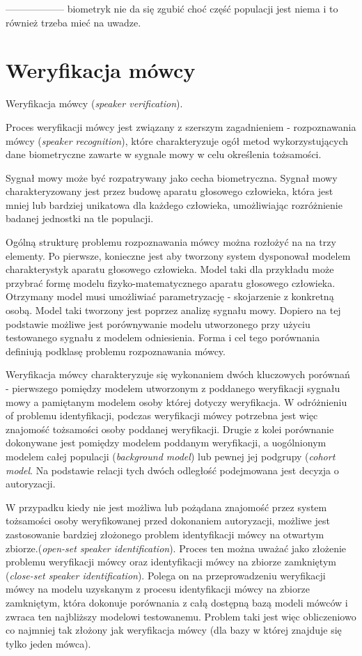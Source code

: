 ------------------ biometryk nie da się zgubić choć część populacji jest niema i to również trzeba mieć na uwadze.

\section{Weryfikacja mówcy}

Weryfikacja mówcy (\textit{speaker verification}).

Proces weryfikacji mówcy jest związany z szerszym zagadnieniem - rozpoznawania mówcy (\textit{speaker recognition}), które charakteryzuje ogół metod wykorzystujących dane biometryczne zawarte w sygnale mowy w celu określenia tożsamości.

Sygnał mowy może być rozpatrywany jako cecha biometryczna. Sygnał mowy charakteryzowany jest przez budowę aparatu głosowego człowieka, która jest mniej lub bardziej unikatowa dla każdego człowieka, umożliwiając rozróżnienie badanej jednostki na tle populacji.

Ogólną strukturę problemu rozpoznawania mówcy można rozłożyć na na trzy elementy.\cite{fosr} Po pierwsze, konieczne jest aby tworzony system dysponował modelem charakterystyk aparatu głosowego człowieka. Model taki dla przykładu może przybrać formę modelu fizyko-matematycznego aparatu głosowego człowieka. Otrzymany model musi umożliwiać parametryzację - skojarzenie z konkretną osobą. Model taki tworzony jest poprzez analizę sygnału mowy. Dopiero na tej podstawie możliwe jest porównywanie modelu utworzonego przy użyciu testowanego sygnału z modelem odniesienia. Forma i cel tego porównania definiują podklasę problemu rozpoznawania mówcy.

Weryfikacja mówcy charakteryzuje się wykonaniem dwóch kluczowych porównań - pierwszego pomiędzy modelem utworzonym z poddanego weryfikacji sygnału mowy a pamiętanym modelem osoby której dotyczy weryfikacja. W odróżnieniu of problemu identyfikacji, podczas weryfikacji mówcy potrzebna jest więc znajomość tożsamości osoby poddanej weryfikacji.
Drugie z kolei porównanie dokonywane jest pomiędzy modelem poddanym weryfikacji, a uogólnionym modelem całej populacji (\textit{background model}) lub pewnej jej podgrupy (\textit{cohort model}. Na podstawie relacji tych dwóch odległość podejmowana jest decyzja o autoryzacji.

W przypadku kiedy nie jest możliwa lub pożądana znajomość przez system tożsamości osoby weryfikowanej przed dokonaniem autoryzacji, możliwe jest zastosowanie bardziej złożonego problem identyfikacji mówcy na otwartym zbiorze.(\textit{open-set speaker identification}). Proces ten można uważać jako złożenie problemu weryfikacji mówcy oraz identyfikacji mówcy na zbiorze zamkniętym (\textit{close-set speaker identification}). Polega on na przeprowadzeniu weryfikacji mówcy na modelu uzyskanym z procesu identyfikacji mówcy na zbiorze zamkniętym, która dokonuje porównania z całą dostępną bazą modeli mówców i zwraca ten najbliższy modelowi testowanemu. Problem taki jest więc obliczeniowo co najmniej tak złożony jak weryfikacja mówcy (dla bazy w której znajduje się tylko jeden mówca).

